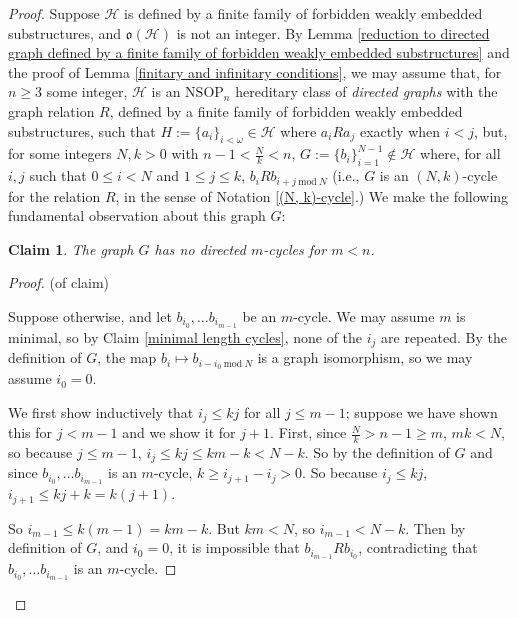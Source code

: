 \documentclass{amsart}
\newtheorem{claim}[theorem]{Claim}
\theoremstyle{definition}
\theoremstyle{remark}
\numberwithin{equation}{section}
\begin{document}
\begin{proof}
    Suppose $\mathcal{H}$ is defined by a finite family of forbidden weakly embedded substructures, and $\mathfrak{o}(\mathcal{H})$ is not an integer. By Lemma \ref{reduction to directed graph defined by a finite family of forbidden weakly embedded substructures} and the proof of Lemma \ref{finitary and infinitary conditions}, we may assume that, for $n \geq 3$ some integer, $\mathcal{H}$ is an $\mathrm{NSOP}_{n}$ hereditary class of \textit{directed graphs} with the graph relation $R$, defined by a finite family of forbidden weakly embedded substructures, such that $H:=\{a_{i}\}_{i < \omega} \in \mathcal{H}$ where $a_{i} R a_{j}$ exactly when $i < j$, but, for some integers $N, k > 0$ with $n-1 <  \frac{N}{k} < n$, $G := \{b_{i}\}^{N -1}_{i =1} \notin \mathcal{H}$ where, for all $i, j$ such that $0 \leq i <N$ and $1 \leq j \leq k$,  $b_{i}R b_{i+j \mathrm{\: mod \:} N}$ (i.e., $G$ is an $(N, k)$-cycle for the relation $R$, in the sense of Notation \ref{(N, k)-cycle}.) We make the following fundamental observation about this graph $G$:

    \begin{claim}\label{(N, k)-cycle has no m-cycles}
       The graph $G$ has no directed $m$-cycles for $m < n$.
    \end{claim}


    \begin{proof}(of claim)

    Suppose otherwise, and let $b_{i_{0}}, \ldots b_{i_{m-1}}$ be an $m$-cycle. We may assume $m$ is minimal, so by Claim \ref{minimal length cycles}, none of the $i_{j}$ are repeated. By the definition of $G$, the map $b_{i} \mapsto b_{i - i_{0} \mathrm{\:mod\:} N}$ is a graph isomorphism, so we may assume $i_{0} = 0$. 
    
    We first show inductively that $i_{j} \leq kj$ for all $j \leq m -1$; suppose we have shown this for $j < m-1$ and we show it for $j+1$. First, since $\frac{N}{k} >  n-1 \geq m$, $mk < N$, so because $j \leq m-1$, $i_{j} \leq kj \leq km-k < N-k$. So by the definition of $G$ and since $b_{i_{0}}, \ldots b_{i_{m-1}}$ is an $m$-cycle, $k \geq i_{j+1} - i_{j} > 0$. So because $i_{j} \leq kj$, $i_{j+1} \leq kj + k = k(j+1)$.

So $i_{m-1} \leq k(m-1) = km - k$. But $km < N$, so $i_{m-1} < N -k $. Then by definition of $G$, and $i_{0} = 0$, it is impossible that $b_{i_{m-1}}Rb_{i_{0}}$, contradicting that $b_{i_{0}}, \ldots b_{i_{m-1}}$ is an $m$-cycle.
    \end{proof}



\end{proof}
\end{document}

